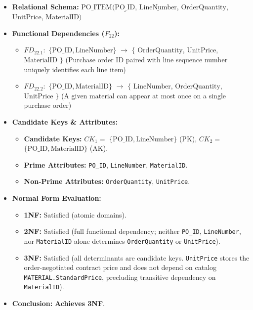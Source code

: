 \documentclass[a4paper,12pt]{report}
\begin{document}
\begin{itemize}
\item
  \textbf{Relational Schema:} \(\text{PO\_ITEM}(\underline{\text{PO\_ID}}\), \(\underline{\text{LineNumber}}\), \(\text{OrderQuantity}\), \(\text{UnitPrice}\), \(\text{MaterialID})\)
\item
  \textbf{Functional Dependencies (\(F_{22}\)):}

  \begin{itemize}
  \item
    \(FD_{22.1}:\) \(\{\text{PO\_ID}, \text{LineNumber}\}\) \(\rightarrow\) \(\{\) \(\text{OrderQuantity}\), \(\text{UnitPrice}\), \(\text{MaterialID}\) \(\}\) (Purchase order ID paired with line sequence number uniquely identifies each line item)
  \item
    \(FD_{22.2}:\) \(\{\text{PO\_ID}, \text{MaterialID}\}\) \(\rightarrow\) \(\{\) \(\text{LineNumber}\), \(\text{OrderQuantity}\), \(\text{UnitPrice}\) \(\}\) (A given material can appear at most once on a single purchase order)
  \end{itemize}
\item
  \textbf{Candidate Keys \& Attributes:}

  \begin{itemize}
  \item
    \textbf{Candidate Keys:} \(CK_{1} =\) \(\{\text{PO\_ID}, \text{LineNumber}\}\) (PK), \(CK_{2} =\) \(\{\text{PO\_ID}, \text{MaterialID}\}\) (AK).
  \item
    \textbf{Prime Attributes:} \texttt{PO\_\allowbreak{}ID}, \texttt{LineNumber}, \texttt{MaterialID}.
  \item
    \textbf{Non-Prime Attributes:} \texttt{OrderQuantity}, \texttt{UnitPrice}.
  \end{itemize}
\item
  \textbf{Normal Form Evaluation:}

  \begin{itemize}
  \item
    \textbf{1NF:} Satisfied (atomic domains).
  \item
    \textbf{2NF:} Satisfied (full functional dependency; neither \texttt{PO\_\allowbreak{}ID}, \texttt{LineNumber}, nor \texttt{MaterialID} alone determines \texttt{OrderQuantity} or \texttt{UnitPrice}).
  \item
    \textbf{3NF:} Satisfied (all determinants are candidate keys. \texttt{UnitPrice} stores the order-negotiated contract price and does not depend on catalog \texttt{MATERIAL.\allowbreak{}StandardPrice}, precluding transitive dependency on \texttt{MaterialID}).
  \end{itemize}
\item
  \textbf{Conclusion:} \textbf{Achieves 3NF}.
\end{itemize}
\end{document}
